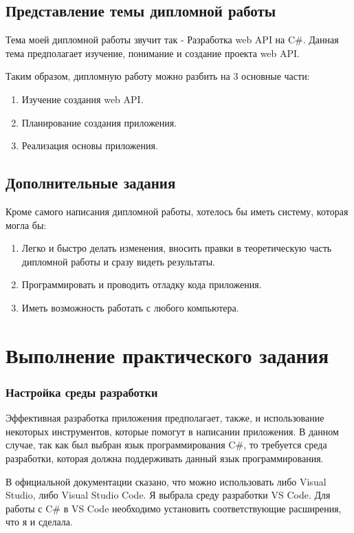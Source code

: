 \documentclass[a4paper,12pt]{report}
\begin{document}
\section{Представление темы дипломной работы}

Тема моей дипломной работы звучит так - Разработка web API на C\#.
Данная тема предполагает изучение, понимание и создание проекта web API.

Таким образом, дипломную работу можно разбить на 3 основные части:
\begin{enumerate}
  \item Изучение создания web API.
  \item Планирование создания приложения.
  \item Реализация основы приложения.
\end{enumerate}

\section{Дополнительные задания}

Кроме самого написания дипломной работы, хотелось бы иметь систему, которая могла бы:
\begin{enumerate}
  \item Легко и быстро делать изменения, вносить правки в теоретическую часть дипломной работы и сразу видеть результаты.
  \item Программировать и проводить отладку кода приложения.
  \item Иметь возможность работать с любого компьютера.
\end{enumerate}

\chapter{Выполнение практического задания}

\subsection{Настройка среды разработки}

Эффективная разработка приложения предполагает, также, и использование некоторых инструментов, которые помогут в написании приложения.
В данном случае, так как был выбран язык программирования C\#, то требуется среда разработки, которая должна поддерживать данный язык программирования.

В официальной документации сказано, что можно использовать либо Visual Studio, либо Visual Studio Code. Я выбрала среду разработки VS Code. 
Для работы с C\# в VS Code необходимо установить соответствующие расширения, что я и сделала.
\end{document}
